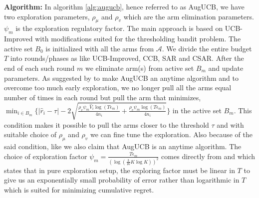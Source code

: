 \label{notation}

\textbf{Algorithm:} In algorithm \ref{alg:augucb}, hence referred to as AugUCB, we have two exploration parameters, $\rho_{\mu}$ and $\rho_v$ which are the arm elimination parameters. $\psi_{m}$ is the exploration regulatory factor. The main approach is based on UCB-Improved with modifications suited for the thresholding bandit problem. The active set $B_{0}$ is initialized with all the arms from $\mathcal{A}$. We divide the entire budget $T$ into rounds/phases as like UCB-Improved, CCB, SAR and CSAR. After the end of each such round $m$ we eliminate arm(s) from active set $B_{m}$ and update parameters. As suggested by \cite{liu2016modification} to make AugUCB an anytime algorithm and to overcome too much early exploration, we no longer pull all the arms equal number of times in each round but pull the arm that minimizes,  
$\min_{i\in B_{m}}\big\lbrace |\hat{r}_{i} - \tau | - 2\sqrt{\frac{\rho_v\psi_m \hat{V}_{i} \log ( T \epsilon_{m})}{4 n_{i}} + \frac{\rho_v\psi_m \log{( T\epsilon_{m})}}{4 n_{i}}} \big\rbrace $
in the active set $B_{m}$. This condition makes it possible to pull the arms closer to the threshold $\tau$ and with suitable choice of $\rho_{\mu}$ and $\rho_v$ we can fine tune the exploration. Also because of the said condition, like \cite{liu2016modification} we also claim that AugUCB is an anytime algorithm. The choice of exploration factor $\psi_m=\frac{T\epsilon_m}{(\log(\frac{3}{16} K\log K))^{2}}$ comes directly from \cite{audibert2010best} and \cite{bubeck2011pure} which states that in pure exploration setup, the exploring factor must be linear in $T$ to give us an exponentially small probability of error rather than logarithmic in $T$ which is suited for minimizing cumulative regret.
